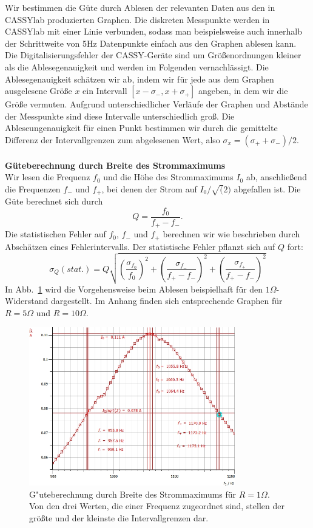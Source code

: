 \documentclass[12pt,a4paper]{article}
\begin{document}
Wir bestimmen die Güte durch Ablesen der relevanten Daten aus den in CASSYlab produzierten Graphen. Die diskreten Messpunkte werden in CASSYlab mit einer Linie verbunden, sodass man beispielsweise auch innerhalb der Schrittweite von 5Hz Datenpunkte einfach aus den Graphen ablesen kann.
Die Digitalisierungsfehler der CASSY-Geräte sind um Größenordnungen kleiner als die Ablesegenauigkeit und werden im Folgenden vernachlässigt. Die Ablesegenauigkeit schätzen wir ab, indem wir für jede aus dem Graphen ausgelesene Größe $x$ ein Intervall $[x-\sigma_-,x+\sigma_+]$ angeben, in dem wir die Größe vermuten. Aufgrund unterschiedlicher Verläufe der Graphen und Abstände der Messpunkte sind diese Intervalle unterschiedlich groß. Die Ableseungenauigkeit für einen Punkt bestimmen wir durch die gemittelte Differenz der Intervallgrenzen zum abgelesenen Wert, also $\sigma_x=(\sigma_++\sigma_-)/2$.\\
\\
\textbf{Güteberechnung durch Breite des Strommaximums}\\
Wir lesen die Frequenz $f_0$ und die Höhe des Strommaximums $I_0$ ab, anschließend die Frequenzen $f_- $ und $f_+$, bei denen der Strom auf $I_0/\sqrt(2)$ abgefallen ist.  Die Güte berechnet sich durch
\begin{equation}\label{eq:guete_ueber_f}
Q=\frac{f_0}{f_+-f_-}.
\end{equation}
Die statistischen Fehler auf $f_0$, $f_-$ und $f_+$ berechnen wir wie beschrieben durch Abschätzen eines Fehlerintervalls. Der statistische Fehler pflanzt sich auf $Q$ fort:
\begin{equation}\label{eq:Fehlerfortpflanzung_Qdurchf}
\sigma_Q(stat.)=Q\sqrt{\left(\frac{\sigma_{f_0}}{f_0}\right)^2+\left(\frac{\sigma_{f_-}}{f_+-f_-}\right)^2+\left(\frac{\sigma_{f_+}}{f_+-f_-}\right)^2}
\end{equation}
In Abb.~\ref{S1Ohm_f0} wird die Vorgehensweise beim Ablesen beispielhaft für den $1\Omega$-Widerstand dargestellt. Im Anhang finden sich entsprechende Graphen für $R=5\Omega$ und $R=10\Omega$.
\begin{figure}[H]
	\centering
	\includegraphics[width=0.8\textwidth]{Daten/S1_f0.jpg}
	\caption{G"uteberechnung durch Breite des Strommaximums für $R=1\Omega$. Von den drei Werten, die einer Frequenz zugeordnet sind, stellen der größte und der kleinste die Intervallgrenzen dar.}
	\label{S1Ohm_f0}
\end{figure}
\end{document}
